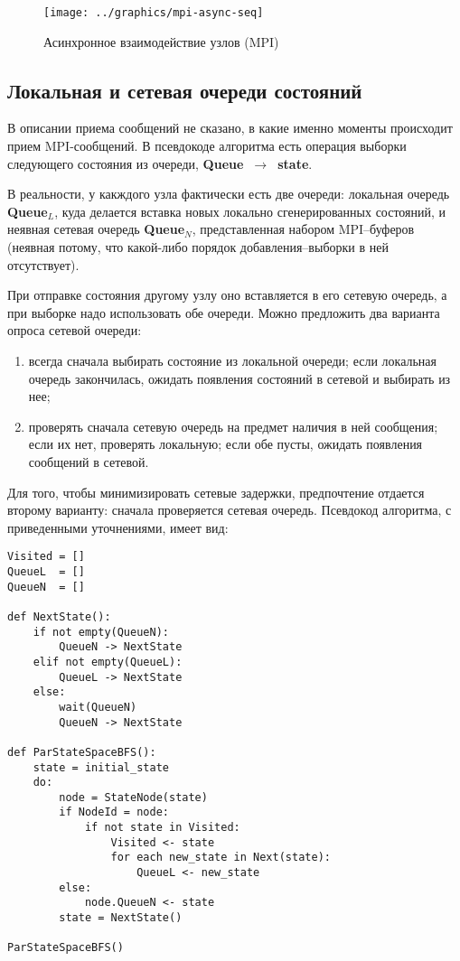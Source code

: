 \documentclass[12pt,a4paper,fleqn]{article}
\newcommand{\Code}[1]{\textbf{\mbox{#1}}}
\begin{document}
\begin{figure}[ht]
  \centering
  \texttt{[image: ../graphics/mpi-async-seq]}  
  \caption{Асинхронное взаимодействие узлов (MPI)}
  \label{fig:mpi-async-seq}
\end{figure}

\subsection{Локальная и сетевая очереди состояний}

В описании приема сообщений не сказано, в какие именно моменты происходит прием MPI-сообщений. В
псевдокоде алгоритма есть операция выборки следующего состояния из очереди, \Code{Queue
  $\rightarrow$ state}.

В реальности, у какждого узла фактически есть две очереди: локальная очередь \Code{Queue$_L$}, куда
делается вставка новых локально сгенерированных состояний, и неявная сетевая очередь
\Code{Queue$_N$}, представленная набором MPI--буферов (неявная потому, что какой-либо порядок
добавления--выборки в ней отсутствует).

При отправке состояния другому узлу оно вставляется в его сетевую очередь, а при выборке надо
использовать обе очереди. Можно предложить два варианта опроса сетевой очереди:
\begin{enumerate}
\item всегда сначала выбирать состояние из локальной очереди; если локальная очередь закончилась,
  ожидать появления состояний в сетевой и выбирать из нее;
\item проверять сначала сетевую очередь на предмет наличия в ней сообщения; если их нет, проверять
  локальную; если обе пусты, ожидать появления сообщений в сетевой.
\end{enumerate}

Для того, чтобы минимизировать сетевые задержки, предпочтение отдается второму варианту: сначала
проверяется сетевая очередь. Псевдокод алгоритма, с приведенными уточнениями, имеет вид:

\begin{lstlisting}[style=pseudocode]
Visited = []
QueueL  = []
QueueN  = []

def NextState():
    if not empty(QueueN):
        QueueN -> NextState
    elif not empty(QueueL):
        QueueL -> NextState
    else:
        wait(QueueN)
        QueueN -> NextState

def ParStateSpaceBFS():
    state = initial_state
    do:
        node = StateNode(state)
        if NodeId = node:
            if not state in Visited:
                Visited <- state
                for each new_state in Next(state):
                    QueueL <- new_state
        else:
            node.QueueN <- state
        state = NextState()

ParStateSpaceBFS()
\end{lstlisting}
\end{document}
